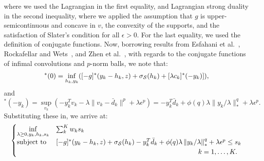 where we used the Lagrangian in the first equality, and Lagrangian strong duality in the second inequality, where we applied the assumption that $g$ is upper-semicontinuous and concave in $v$, the convexity of the supports, and the satisfaction of Slater's condition for all $\epsilon > 0$. For the last equality, we used the definition of conjugate functions. Now, borrowing results from Esfahani et al.~\cite[Theorem 4.2]{mohajerin_esfahani_data-driven_2018}, Rockafellar and Wets~\cite[Theorem 11.23(a), p. 493]{rockafellar_wets_1998}, and Zhen et al.~\cite[Lemma B.8]{zhen2021mathematical}, with regards to the conjugate functions of infimal convolutions and $p$-norm balls, we note that:
\begin{equation*}
	[-g + \chi_{\supp} + \lambda c_k]^* (0) = \underset{h_{k},y_{k}}{\inf} ([-g]^*(y_{k} - h_{k},z) + \sigma_{\supp}(h_{k}) + [\lambda c_k]^* (-y_{k})]),
\end{equation*}
and
\begin{equation*}
	[\lambda c_k]^* (-y_{k}) = \underset{v_k}{\sup}(-y_{k}^T v_k - \lambda \| v_k - \bar{d}_k\|^p + \lambda \epsilon^p) =-y_{k}^T\bar{d}_k + \phi(q)\lambda {\|}y_{k}/\lambda{\|}^q_* + \lambda \epsilon^p.
\end{equation*}
Substituting these in, we arrive at:
\begin{equation*}
	\begin{aligned}
\begin{cases}
	\underset{\lambda \geq 0, y_{k},h_{k}, s_k}{\inf} & \sum_k^K w_k s_k\\
	\mbox{subject to} & [-g]^*(y_{k} - h_{k},z) + \sigma_{\supp}(h_{k}) - y_{k}^T\bar{d}_k  + \phi(q)\lambda \left\|y_{k}/\lambda \right\|^q_* + \lambda \epsilon^p \le s_k \\
	& \hspace{7cm} \quad k = 1,\dots,K.
\end{cases}
\end{aligned}
\end{equation*}
